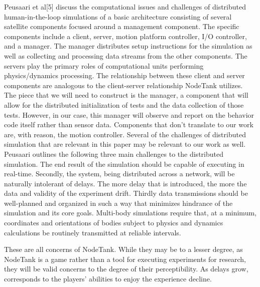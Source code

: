 \documentclass[conference]{IEEEtran}
\begin{document}
Peusaari et al[5] discuss the computational issues and challenges of distributed human-in-the-loop simulations of a basic architecture consisting of several satellite components
focused around a management component. The specific components include a client, server, motion platform controller, I/O controller, and a manager. The manager distributes setup
instructions for the simulation as well as collecting and processing data  streams from the other components. The servers play the primary roles of computational units performing
physics/dynamics processing. The relationship between these client and server components are analogous to the client-server relationship NodeTank utilizes. The piece that we will
need to construct is the manager, a component that will allow for the distributed initialization of tests and the data collection of those tests. However, in our case, this manager
will observe and report on the behavior code itself rather than sensor data. Components that don’t translate to our work are, with reason, the motion controller. Several of the
challenges of distributed simulation that are relevant in this paper may be relevant to our work as well. Peusaari outlines the following three main challenges to the distributed
simulation. The end result of the simulation should be capable of executing in real-time. Secondly, the system, being distributed across a network, will be naturally intolerant of
delays. The more delay that is introduced, the more the data and validity of the experiment drift. Thirdly data transmissions should be well-planned and organized in such a way that
minimizes hindrance of the simulation and its core goals. Multi-body simulations require that, at a minimum, coordinates and orientations of bodies subject to physics and dynamics
calculations be routinely transmitted at reliable intervals.

These are all concerns of NodeTank. While they may be to a lesser degree, as NodeTank is a game rather than a tool for executing experiments for research, they will be valid concerns
 to the degree of their perceptibility. As delays grow, corresponds to the players’ abilities to enjoy the experience decline.
\end{document}
